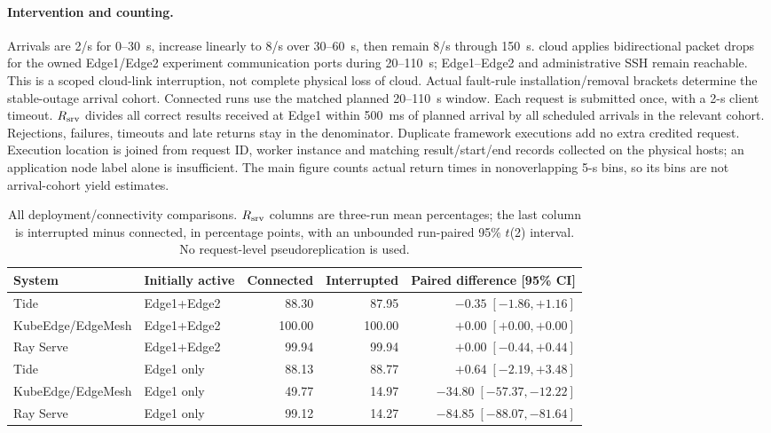 \paragraph{Intervention and counting.}
Arrivals are 2/s for 0--30~s, increase linearly to 8/s over 30--60~s, then remain 8/s through 150~s. cloud applies bidirectional packet drops for the owned Edge1/Edge2 experiment communication ports during 20--110~s; Edge1--Edge2 and administrative SSH remain reachable. This is a scoped cloud-link interruption, not complete physical loss of cloud. Actual fault-rule installation/removal brackets determine the stable-outage arrival cohort. Connected runs use the matched planned 20--110~s window. Each request is submitted once, with a 2-s client timeout. $R_{\rm srv}$ divides all correct results received at Edge1 within 500~ms of planned arrival by all scheduled arrivals in the relevant cohort. Rejections, failures, timeouts and late returns stay in the denominator. Duplicate framework executions add no extra credited request. Execution location is joined from request ID, worker instance and matching result/start/end records collected on the physical hosts; an application node label alone is insufficient. The main figure counts actual return times in nonoverlapping 5-s bins, so its bins are not arrival-cohort yield estimates.

\begin{table}[htbp]
\centering\small
\caption{All deployment/connectivity comparisons. $R_{\rm srv}$ columns are three-run mean percentages; the last column is interrupted minus connected, in percentage points, with an unbounded run-paired 95\% $t$(2) interval. No request-level pseudoreplication is used.}
\label{tab:domain-paired}
\setlength{\tabcolsep}{4pt}
\begin{tabular}{llrrr}
\toprule
System & Initially active & Connected & Interrupted & Paired difference [95\% CI]\\
\midrule
Tide & Edge1+Edge2 & 88.30 & 87.95 & $-0.35\;[-1.86, +1.16]$\\
KubeEdge/EdgeMesh & Edge1+Edge2 & 100.00 & 100.00 & $+0.00\;[+0.00, +0.00]$\\
Ray Serve & Edge1+Edge2 & 99.94 & 99.94 & $+0.00\;[-0.44, +0.44]$\\
Tide & Edge1 only & 88.13 & 88.77 & $+0.64\;[-2.19, +3.48]$\\
KubeEdge/EdgeMesh & Edge1 only & 49.77 & 14.97 & $-34.80\;[-57.37, -12.22]$\\
Ray Serve & Edge1 only & 99.12 & 14.27 & $-84.85\;[-88.07, -81.64]$\\
\bottomrule
\end{tabular}
\end{table}

